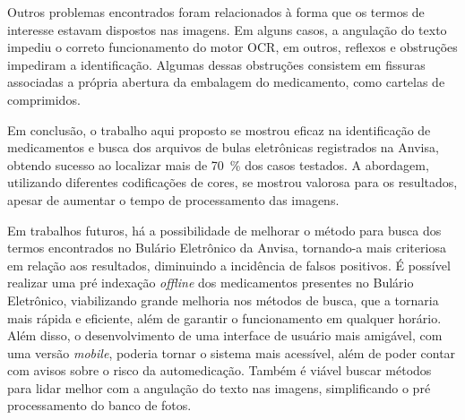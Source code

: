 Outros problemas encontrados foram relacionados à forma que os termos de interesse estavam dispostos nas imagens.
Em alguns casos, a angulação do texto impediu o correto funcionamento do motor \ac{OCR}, em outros, reflexos e obstruções impediram a identificação.
Algumas dessas obstruções consistem em fissuras associadas a própria abertura da embalagem do medicamento, como cartelas de comprimidos.

Em conclusão, o trabalho aqui proposto se mostrou eficaz na identificação de medicamentos e busca dos arquivos de bulas eletrônicas registrados na \ac{Anvisa}, obtendo sucesso ao localizar mais de \SI{70}{\percent} dos casos testados.
A abordagem, utilizando diferentes codificações de cores, se mostrou valorosa para os resultados, apesar de aumentar o tempo de processamento das imagens.

Em trabalhos futuros, há a possibilidade de melhorar o método para busca dos termos encontrados no Bulário Eletrônico da \ac{Anvisa}, tornando-a mais criteriosa em relação aos resultados, diminuindo a incidência de falsos positivos.
É possível realizar uma pré indexação \textit{offline} dos medicamentos presentes no Bulário Eletrônico, viabilizando grande melhoria nos métodos de busca, que a tornaria mais rápida e eficiente, além de garantir o funcionamento em qualquer horário.
Além disso, o desenvolvimento de uma interface de usuário mais amigável, com uma versão \textit{mobile}, poderia tornar o sistema mais acessível, além de poder contar com avisos sobre o risco da automedicação.
Também é viável buscar métodos para lidar melhor com a angulação do texto nas imagens, simplificando o pré processamento do banco de fotos.


